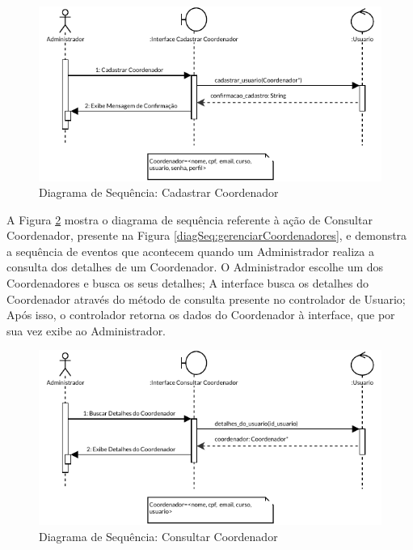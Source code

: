 \begin{figure}[H]
    \centering
    \includegraphics[width=\textwidth]{dados/figuras/Proposta/DiagramasDeSequencia/Gerenciar Coodenadores-Cadastrar Coordenador.pdf}
    \caption{Diagrama de Sequência: Cadastrar Coordenador}
    \label{diagSeq:cadastrarCoordenador}
\end{figure}

A Figura \ref{diagSeq:consultarCoordenador} mostra o diagrama de sequência referente à ação de Consultar Coordenador, presente na Figura \ref{diagSeq:gerenciarCoordenadores}, e demonstra a sequência de eventos que acontecem quando um Administrador realiza a consulta dos detalhes de um Coordenador. O Administrador escolhe um dos Coordenadores e busca os seus detalhes; A interface busca os detalhes do Coordenador através do método de consulta presente no controlador de Usuario; Após isso, o controlador retorna os dados do Coordenador à interface, que por sua vez exibe ao Administrador.

\begin{figure}[H]
    \centering
    \includegraphics[width=\textwidth]{dados/figuras/Proposta/DiagramasDeSequencia/Gerenciar Coodenadores-Consultar Coordenador.pdf}
    \caption{Diagrama de Sequência: Consultar Coordenador}
    \label{diagSeq:consultarCoordenador}
\end{figure}

